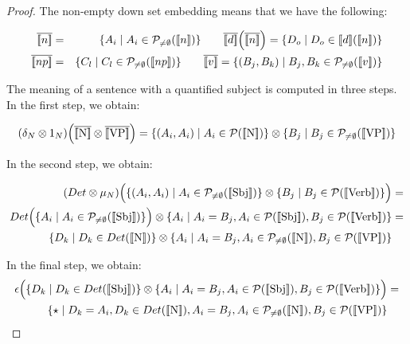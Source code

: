 \begin{proof}
The non-empty down set embedding means that we have the following: 

\begin{eqnarray*}
\overline{\semantics{{n}}} &=& \{A_i \mid A_i \in {\cal P}_{\neq \emptyset}(\semantics{{n}})\} \qquad 
\overline{\semantics{d}}\Big(\overline{\semantics{{n}}}\Big) = \{D_o \mid D_o \in {\semantics{d}}(\semantics{{n}})\}\\
\overline{\semantics{{np}}} &=& \{C_l \mid C_l \in {\cal P}_{\neq \emptyset}(\semantics{{np}})\} \qquad 
\overline{\semantics{{v}}} = \{(B_j, B_k) \mid B_j, B_k  \in {\cal P}_{\neq \emptyset}(\semantics{{v}})\}\\
\end{eqnarray*}

\noindent
The meaning of a sentence with a quantified subject is computed in three steps. In the  first step, we obtain:

\begin{align*}
(\delta_N \otimes 1_{N})\Big(\overline{\semantics{\text{N}}} \otimes \overline{\semantics{\text{VP}}}\Big) =  \{(A_i, A_i) \mid A_i \in {\cal P} (\semantics{\text{N}})\} \otimes \{B_j \mid B_j \in  {\cal P}_{\neq \emptyset} (\semantics{\text{VP}})\}
\end{align*}


\noindent
In the second step, we obtain:

\begin{align*}
(Det \otimes  \mu_N)\Big(\{(A_i, A_i) \mid A_i \in {\cal P}_{\neq \emptyset} (\semantics{\text{Sbj}})\} \otimes \{B_j \mid B_j \in  {\cal P} (\semantics{\text{Verb}})\}\Big) &=\\
Det\Big(\{A_i \mid A_i \in {\cal P}_{\neq \emptyset} (\semantics{\text{Sbj}})\}\Big) \otimes \{A_i \mid A_i = B_j, A_i \in {\cal P} (\semantics{\text{Sbj}}), B_j \in  {\cal P}(\semantics{\text{Verb}})\} &=\\
\{D_k \mid D_k \in Det(\semantics{\text{N}})\} \otimes \{A_i \mid A_i = B_j, A_i \in {\cal P}_{\neq \emptyset} (\semantics{\text{N}}), B_j \in  {\cal P}(\semantics{\text{VP}})\}
\end{align*}

\noindent
In the final step, we obtain:
\begin{align*}
\epsilon\Big(\{D_k \mid D_k \in Det(\semantics{\text{Sbj}})\} \otimes \{A_i \mid A_i = B_j, A_i \in {\cal P} (\semantics{\text{Sbj}}), B_j \in  {\cal P}(\semantics{\text{Verb}})\}\Big) &=\\
 \{\star \mid  D_k = A_i, D_k \in Det(\semantics{\text{N}}), A_i = B_j, A_i \in {\cal P}_{\neq \emptyset} (\semantics{\text{N}}), B_j \in  {\cal P} (\semantics{\text{VP}})\}
\end{align*}
\end{proof}




